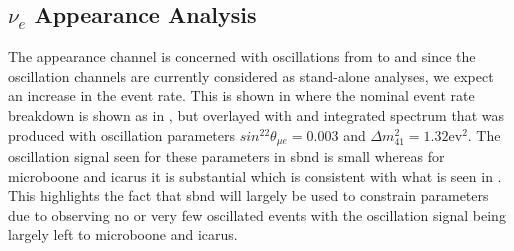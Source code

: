 \clearpage
\subsection{\texorpdfstring{$\nu_e$ Appearance Analysis}{nue Appearance Analysis}}\label{sec:nue_app}

The \nue appearance channel is concerned with oscillations from \numu to \nue and since the oscillation channels are currently considered as stand-alone analyses, we expect an increase in the event rate. This is shown in  where the nominal event rate breakdown is shown as in , but overlayed with and integrated spectrum that was produced with oscillation parameters $sin^22\theta_{\mu e} = 0.003$ and $\Delta m^2_{41} = 1.32 \text{ev}^2$. The oscillation signal seen for these parameters in \gls{sbnd} is small whereas for \gls{microboone} and \gls{icarus} it is substantial which is consistent with what is seen in . This highlights the fact that \gls{sbnd} will largely be used to constrain parameters due to observing no or very few oscillated events with the oscillation signal being largely left to \gls{microboone} and \gls{icarus}. 

